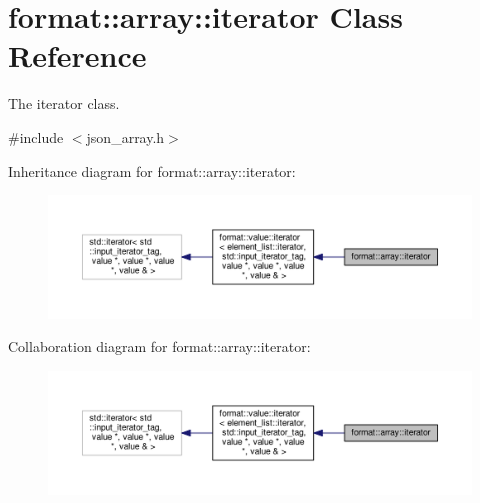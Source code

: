 \hypertarget{classformat_1_1array_1_1iterator}{}\section{format\+:\+:array\+:\+:iterator Class Reference}
\label{classformat_1_1array_1_1iterator}


The iterator class.  




{\ttfamily \#include $<$json\+\_\+array.\+h$>$}



Inheritance diagram for format\+:\+:array\+:\+:iterator\+:
\nopagebreak
\begin{figure}[H]
\begin{center}
\leavevmode
\includegraphics[width=350pt]{classformat_1_1array_1_1iterator__inherit__graph}
\end{center}
\end{figure}


Collaboration diagram for format\+:\+:array\+:\+:iterator\+:
\nopagebreak
\begin{figure}[H]
\begin{center}
\leavevmode
\includegraphics[width=350pt]{classformat_1_1array_1_1iterator__coll__graph}
\end{center}
\end{figure}
